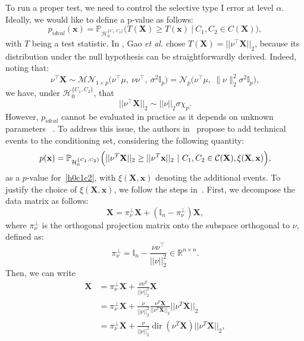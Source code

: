 \documentclass[a4paper,11pt]{article}
\theoremstyle{plain}
\newcommand{\norm}[1]{||#1||}
\newcommand{\1}{\mathbf{1}}
\newcommand{\projnu}{\pi_{\nu}^{\perp}}
\begin{document}
To run a proper test, we need to control the selective type I error at level $\alpha$.
Ideally, we would like to define a p-value as follows: 
\[
  p_{ideal}(\mathbf{x}) = \mathbb{P}_{\mathcal{H}_0^{\{C_1,C_2\}}}\bigl(T(\mathbf{X}) \geq T(\mathbf{x}) ~ | ~ C_1,C_2 \in C(\mathbf{X})\bigr),
\]
with $T$ being a test statistic. In \cite{Gao}, Gao \textit{et al.} chose $T(\mathbf{X}) = \norm{\nu^\top\mathbf{X}}_2$, because its distribution under the null hypothesis can be straightforwardly derived. Indeed, noting that:
\begin{equation*}
\nu^\top \mathbf{X}
\sim \mathcal{MN}_{1 \times p}\bigl(\nu^\top \mu,\ \nu \nu^\top,\ \sigma^2 \mathbb{I}_p\bigr) = \mathcal{N}_p\bigl(\nu^\top \mu,\ \|\nu\|_2^2 \sigma^2 \mathbb{I}_p\bigr),
\end{equation*}
we have, under $\mathcal{H}_0^{\{C_1,C_2\}}$, that
\begin{equation}
  \norm{\nu^\top \mathbf{X}}_2                                \sim \norm{\nu}_2 \sigma \chi_p.
\end{equation}
However, $p_{ideal}$ cannot be evaluated in practice as it depends on unknown parameters ~\cite{Gao}. To address this issue, the authors in~\cite{Gao} propose to add technical events to the conditioning set, considering the following quantity: 
\begin{equation}\label{pvalcondi}
  p(\mathbf{x}) = \mathbb{P}_{\mathcal{H}_0^{\{C_1,C_2\}}}\Bigl(\norm{\nu^T\mathbf{X}}_2 \geq \norm{\nu^T\mathbf{x}}_2 ~ | ~ C_1,C_2 \in \mathcal{C}(\mathbf{X}), \xi(\mathbf{X},\mathbf{x})\Bigr),
\end{equation}
as a $p$-value for~\eqref{h0c1c2}, with $\xi(\mathbf{X},\mathbf{x})$ denoting the additional events. To justify the choice of $\xi(\mathbf{X},\mathbf{x})$, we follow the steps in~\cite{Gao}. First, we decompose the data matrix as follows:
\begin{equation}
  \mathbf{X} = \projnu\mathbf{X} + (\mathbb{I}_n - \projnu)\mathbf{X},
\end{equation}
where $\projnu$ is the orthogonal projection matrix onto the subspace orthogonal to $\nu$, defined as:
\begin{equation}
  \projnu = \mathbb{I}_n - \frac{\nu\nu^\top}{\norm{\nu}_2^2} \in \mathbb{R}^{n\times n}.
\end{equation}
Then, we can write
\begin{equation}
\begin{aligned}
  \mathbf{X} &= \projnu \mathbf{X} + \frac{\nu \nu^T}{\norm{\nu}_2^2}\mathbf{X} \\
   &= \projnu \mathbf{X} + \frac{\nu}{\norm{\nu}_2^2}\frac{\nu^T \mathbf{X}}{\norm{\nu^T \mathbf{X}}_2}\norm{\nu^T \mathbf{X}}_2 \\
   &= \projnu \mathbf{X} + \frac{\nu}{\norm{\nu}_2^2} \operatorname{dir}(\nu^T \mathbf{X})\norm{\nu^T \mathbf{X}}_2,
\end{aligned}
\end{equation}
\end{document}
